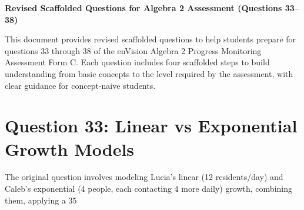\documentclass[12pt]{article}
\begin{document}
\begin{center}
    \textbf{Revised Scaffolded Questions for Algebra 2 Assessment (Questions 33--38)}
\end{center}

This document provides revised scaffolded questions to help students prepare for questions 33 through 38 of the enVision Algebra 2 Progress Monitoring Assessment Form C. Each question includes four scaffolded steps to build understanding from basic concepts to the level required by the assessment, with clear guidance for concept-naive students.

\section*{Question 33: Linear vs Exponential Growth Models}
The original question involves modeling Lucia’s linear (12 residents/day) and Caleb’s exponential (4 people, each contacting 4 more daily) growth, combining them, applying a 35%
\end{document}
